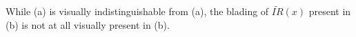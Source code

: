 While (a) is visually indistinguishable from (a), the blading of $\widetilde{IR}(x)$ present in (b) is not at all visually present in (b).
%

